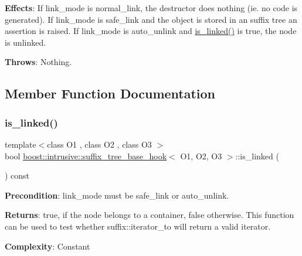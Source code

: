 {\bfseries Effects}\+: If link\+\_\+mode is {\ttfamily normal\+\_\+link}, the destructor does nothing (ie. no code is generated). If link\+\_\+mode is {\ttfamily safe\+\_\+link} and the object is stored in an suffix tree an assertion is raised. If link\+\_\+mode is {\ttfamily auto\+\_\+unlink} and {\ttfamily \hyperlink{classboost_1_1intrusive_1_1suffix__tree__base__hook_aa7681d0387834b9a0e1822e79ac1c531}{is\+\_\+linked()}} is true, the node is unlinked.

{\bfseries Throws}\+: Nothing. 

\subsection{Member Function Documentation}
\mbox{\label{classboost_1_1intrusive_1_1suffix__tree__base__hook_aa7681d0387834b9a0e1822e79ac1c531}} 
\subsubsection{\texorpdfstring{is\+\_\+linked()}{is\_linked()}}
{\footnotesize\ttfamily template$<$class O1 , class O2 , class O3 $>$ \\
bool \hyperlink{classboost_1_1intrusive_1_1suffix__tree__base__hook}{boost\+::intrusive\+::suffix\+\_\+tree\+\_\+base\+\_\+hook}$<$ O1, O2, O3 $>$\+::is\+\_\+linked (\begin{DoxyParamCaption}{ }\end{DoxyParamCaption}) const}

{\bfseries Precondition}\+: link\+\_\+mode must be {\ttfamily safe\+\_\+link} or {\ttfamily auto\+\_\+unlink}.

{\bfseries Returns}\+: true, if the node belongs to a container, false otherwise. This function can be used to test whether {\ttfamily suffix\+::iterator\+\_\+to} will return a valid iterator.

{\bfseries Complexity}\+: Constant \mbox{\label{classboost_1_1intrusive_1_1suffix__tree__base__hook_a3f1dff2ec03d48d4c4caad6622374e7a}} 
